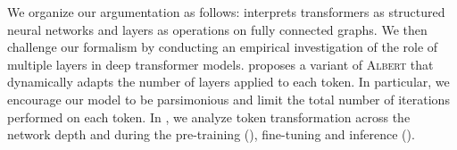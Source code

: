 We organize our argumentation as follows:  interprets transformers as structured neural networks and layers as operations on fully connected graphs. We then challenge our formalism by conducting an empirical investigation of the role of multiple layers in deep transformer models.  proposes a variant of \textsc{Albert} \parencite{simoulin_2021b} that dynamically adapts the number of layers applied to each token. In particular, we encourage our model to be parsimonious and limit the total number of iterations performed on each token. In , we analyze token transformation across the network depth and during the pre-training (), fine-tuning and inference ().












